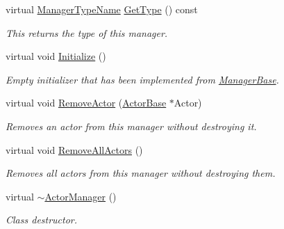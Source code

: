 \begin{DoxyCompactItemize}
virtual \hyperlink{classphys_1_1ManagerBase_aaa6ccddf23892eaccb898529414f80a5}{ManagerTypeName} \hyperlink{classphys_1_1ActorManager_a7f529913ac6d7c74adfade5c383eeb25}{GetType} () const 
\begin{DoxyCompactList}\small\item\em This returns the type of this manager. \item\end{DoxyCompactList}\item 
\hypertarget{classphys_1_1ActorManager_a231586ede5669da350ced7f5dcd0bee2}{
virtual void \hyperlink{classphys_1_1ActorManager_a231586ede5669da350ced7f5dcd0bee2}{Initialize} ()}
\label{classphys_1_1ActorManager_a231586ede5669da350ced7f5dcd0bee2}

\begin{DoxyCompactList}\small\item\em Empty initializer that has been implemented from \hyperlink{classphys_1_1ManagerBase}{ManagerBase}. \item\end{DoxyCompactList}\item 
virtual void \hyperlink{classphys_1_1ActorManager_ac5d3eaf8733a53f433293b0341db55f2}{RemoveActor} (\hyperlink{classphys_1_1ActorBase}{ActorBase} $\ast$Actor)
\begin{DoxyCompactList}\small\item\em Removes an actor from this manager without destroying it. \item\end{DoxyCompactList}\item 
\hypertarget{classphys_1_1ActorManager_aab80825c7dfbbcf33712d94e925faae8}{
virtual void \hyperlink{classphys_1_1ActorManager_aab80825c7dfbbcf33712d94e925faae8}{RemoveAllActors} ()}
\label{classphys_1_1ActorManager_aab80825c7dfbbcf33712d94e925faae8}

\begin{DoxyCompactList}\small\item\em Removes all actors from this manager without destroying them. \item\end{DoxyCompactList}\item 
\hypertarget{classphys_1_1ActorManager_ad291d64d82d1ec10c75c356e8ddf75d1}{
virtual \hyperlink{classphys_1_1ActorManager_ad291d64d82d1ec10c75c356e8ddf75d1}{$\sim$ActorManager} ()}
\label{classphys_1_1ActorManager_ad291d64d82d1ec10c75c356e8ddf75d1}

\begin{DoxyCompactList}\small\item\em Class destructor. \item\end{DoxyCompactList}\end{DoxyCompactItemize}
